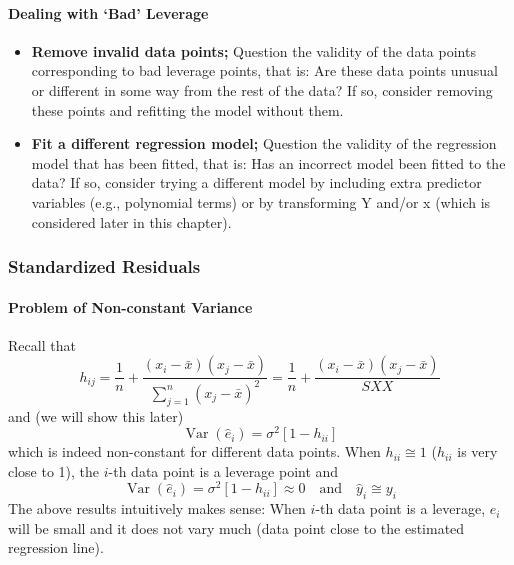 \documentclass[11pt]{article}
\begin{document}
\paragraph{Dealing with `Bad' Leverage}
\begin{itemize}
    \item \textbf{Remove invalid data points;} Question the validity of the data points corresponding to bad leverage points, that is: Are these data points unusual or different in some way from the rest of the data? If so, consider removing these points and refitting the model without them. 
    \item \textbf{Fit a different regression model;} Question the validity of the regression model that has been fitted, that is: Has an incorrect model been fitted to the data? If so, consider trying a different model by including extra predictor variables (e.g., polynomial terms) or by transforming Y and/or x (which is considered later in this chapter).
\end{itemize}

\subsubsection{Standardized Residuals}
\paragraph{Problem of Non-constant Variance} Recall that 
\begin{equation*}
    h_{i j}=\frac{1}{n}+\frac{\left(x_{i}-\bar{x}\right)\left(x_{j}-\bar{x}\right)}{\sum_{j=1}^{n}\left(x_{j}-\bar{x}\right)^{2}}=\frac{1}{n}+\frac{\left(x_{i}-\bar{x}\right)\left(x_{j}-\bar{x}\right)}{S X X}
\end{equation*}
and (we will show this later)
\begin{equation*}
    \operatorname{Var}\left(\hat{e}_{i}\right)=\sigma^{2}\left[1-h_{i i}\right]
\end{equation*}
which is indeed non-constant for different data points. When  $h_{ii} \cong 1$ ($h_{ii}$ is very close to 1), the $i$-th data point is a leverage point and 
\begin{equation*}
    \operatorname{Var}(\hat{e}_i) = \sigma^{2}\left[1-h_{i i}\right] \approx 0 \quad \text{and} \quad \hat{y}_{i} \cong y_{i}
\end{equation*}
The above results intuitively makes sense: When $i$-th data point is a leverage, $\hat{e}_i$ will be small and it does not vary much (data point close to the estimated regression line). 
\end{document}
